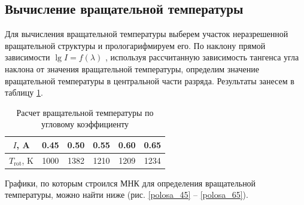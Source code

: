 \subsection{Вычисление вращательной температуры}
Для вычисления вращательной температуры выберем участок неразрешенной
вращательной структуры и прологарифмируем его. По наклону прямой зависимости $\lg I=f(\lambda)$ , используя рассчитанную
зависимость тангенса угла наклона от значения вращательной температуры, определим значение вращательной температуры в центральной части разряда. Результаты занесем в таблицу \ref{tab:T_rot}.

\begin{table}[H]
	\centering
	\caption{Расчет вращательной температуры по угловому коэффициенту}
	\begin{tabular}{|c||c|c|c|c|c|}
		\hline 
		$I$, A & 0.45 & 0.50 & 0.55 & 0.60 & 0.65 \\ 
		\hline 
		$T_\text{rot}$, K & 1000 & 1382 & 1210 & 1209 & 1234 \\
		\hline 
	\end{tabular} 
	\label{tab:T_rot}
\end{table}

Графики, по которым строился МНК для определения вращательной температуры, можно найти ниже (рис. \ref{polosa_45} -- \ref{polosa_65}).

